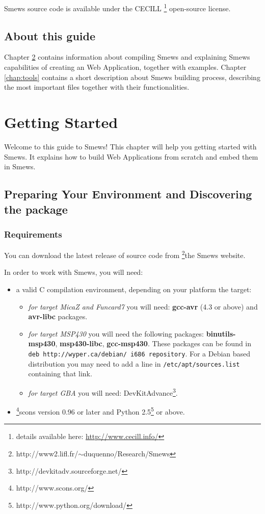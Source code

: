 \documentclass{report}
\begin{document}
Smews source code is available under the CECILL \footnote{details available here: \url{http://www.cecill.info/}} open-source license.

\section{About this guide}

Chapter \ref{chap:gettingstarted} contains information about compiling Smews and explaining Smews capabilities of creating an
Web Application, together with examples. Chapter \ref{chap:tools} contains a short description about Smews building 
process, describing the most important files together with their functionalities.


\chapter{Getting Started}
\label{chap:gettingstarted}

Welcome to this guide to Smews! This chapter will help you getting
started with Smews. It explains how to build Web Applications from scratch and embed them in Smews.

\section{Preparing Your Environment and Discovering the package}

\subsection{Requirements}

You can download the latest release of source code from \footnote{http://www2.lifl.fr/$\sim$duquenno/Research/Smews}{the Smews website}.

In order to work with Smews, you will need:
\begin{itemize}
  \item a valid C compilation environment, depending on your platform the target:
	\begin{itemize}
	  \item \emph{for target MicaZ and Funcard7} you will need: \textbf{gcc-avr}  (4.3 or above) and \textbf{avr-libc} packages.
	  \item \emph{for target MSP430} you will need the following packages: \textbf{binutils-msp430}, \textbf{msp430-libc}, \textbf{gcc-msp430}. These packages can be found in \texttt{deb http://wyper.ca/debian/ i686 repository}. For a Debian based distribution you may need to add a line in \texttt{/etc/apt/sources.list} containing that link.
	  \item \emph{for target GBA} you will need: DevKitAdvance\footnote{http://devkitadv.sourceforge.net/}.
	\end{itemize}
  \item \footnote{http://www.scons.org/}{scons} version 0.96 or later and Python 2.5\footnote{http://www.python.org/download/} or above.
\end{itemize}
\end{document}
